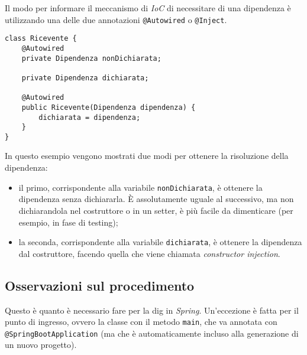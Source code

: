 Il modo per informare il meccanismo di \emph{IoC} di necessitare di una dipendenza è utilizzando una delle due annotazioni \texttt{@Autowired} o \texttt{@Inject}.
\begin{lstlisting}
class Ricevente {
    @Autowired
    private Dipendenza nonDichiarata;

    private Dipendenza dichiarata;

    @Autowired
    public Ricevente(Dipendenza dipendenza) {
        dichiarata = dipendenza;
    }
}
\end{lstlisting}
In questo esempio vengono mostrati due modi per ottenere la risoluzione della dipendenza:
\begin{itemize}
    \item il primo, corrispondente alla variabile \texttt{nonDichiarata}, è ottenere la dipendenza senza dichiararla.
    È assolutamente uguale al successivo, ma non dichiarandola nel costruttore o in un setter, è più facile da dimenticare (per esempio, in fase di testing);
    \item la seconda, corrispondente alla variabile \texttt{dichiarata}, è ottenere la dipendenza dal costruttore, facendo quella che viene chiamata \emph{constructor injection}.
\end{itemize}

\subsection{Osservazioni sul procedimento}
\label{subsec:osservazioni-procedimento-spring}

Questo è quanto è necessario fare per la \gls{dig} in \emph{Spring}. Un'eccezione è fatta per il punto di ingresso, ovvero la classe con il metodo \texttt{main}, che va annotata con \texttt{@SpringBootApplication} (ma che è automaticamente incluso alla generazione di un nuovo progetto).

